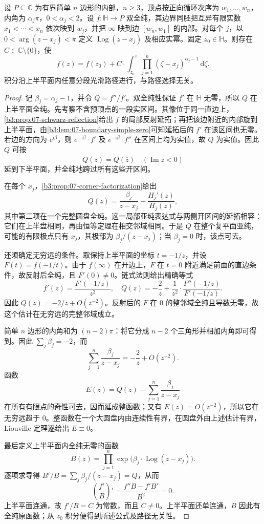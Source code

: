 \begin{theorem}\label{b3:thm:07-schwarz-christoffel}
设 \(P\subseteq\mathbb C\) 为有界简单 \(n\) 边形的内部，\(n\ge3\)，顶点按正向循环次序为 \(w_1,\ldots,w_n\)，内角为 \(\alpha_j\pi\)，\(0<\alpha_j<2\)。设 \(f:\mathbb H\rightarrow P\) 双全纯，其边界同胚把互异有限实数 \(x_1<\cdots<x_n\) 依次映到 \(w_j\)，并把 \(\infty\) 映到边 \([w_n,w_1]\) 的内部。对每个 \(j\)，以 \(0<\arg(z-x_j)<\pi\) 定义 \(\operatorname{Log}(z-x_j)\) 及相应实幂。固定 \(z_0\in\mathbb H\)。则存在 \(C\in\mathbb C\setminus\{0\}\)，使
\[
 f(z)=f(z_0)+C\cdot\int_{z_0}^{z}
 \prod_{j=1}^n(\zeta-x_j)^{\alpha_j-1}\,\mathrm{d}\zeta.
\]
积分沿上半平面内任意分段光滑路径进行，与路径选择无关。
\end{theorem}
\begin{proof}
记 \(\beta_j=\alpha_j-1\)，并令 \(Q=f''/f'\)。双全纯性保证 \(f'\) 在 \(\mathbb H\) 无零，所以 \(Q\) 在上半平面全纯。先考察不含预顶点的一段实区间。其像位于同一直边上，\cref{b3:prop:07-schwarz-reflection}给出 \(f\) 的局部反射延拓；再把该边附近的内部旋到上半平面，由\cref{b3:lem:07-boundary-simple-zero}可知延拓后的 \(f'\) 在该区间也无零。若边的方向为 \(e^{\mathrm{i}\beta}\)，则 \(e^{-\mathrm{i}\beta}\cdot f'\) 及 \(e^{-\mathrm{i}\beta}\cdot f''\) 在区间上均为实值，故 \(Q\) 为实值。因此 \(Q\) 可按
\[
 Q(z)=\overline{Q(\overline z)}\quad(\operatorname{Im}z<0)
\]
延到下半平面，并全纯地跨过所有这些开区间。

在每个 \(x_j\)，\cref{b3:prop:07-corner-factorization}给出
\[
 Q(z)=\frac{\beta_j}{z-x_j}+\frac{H_j'(z)}{H_j(z)},
\]
其中第二项在一个完整圆盘全纯。这一局部亚纯表达式与两侧开区间的延拓相容：它们在上半盘相同，再由恒等定理在相交邻域相同。于是 \(Q\) 在整个复平面亚纯，可能的有限极点只有 \(x_j\)，其极部为 \(\beta_j/(z-x_j)\)；当 \(\beta_j=0\) 时，该点可去。

还须确定无穷远的条件。取保持上半平面的坐标 \(t=-1/z\)，并设 \(F(t)=f(-1/t)\)。由于 \(f(\infty)\) 在开边上，\(F\) 在 \(t=0\) 附近满足前面的直边条件，故反射后全纯，且 \(F'(0)\ne0\)。链式法则给出精确等式
\[
 f'(z)=\frac{F'(-1/z)}{z^2},\quad
 Q(z)=-\frac2z+\frac1{z^2}\cdot
 \frac{F''(-1/z)}{F'(-1/z)}.
\]
因此 \(Q(z)=-2/z+O(z^{-2})\)。反射后的 \(F\) 在 \(0\) 的整邻域全纯且导数无零，故这个估计在无穷远的完整邻域成立。

简单 \(n\) 边形的内角和为 \((n-2)\pi\)：将它分成 \(n-2\) 个三角形并相加内角即可得到。因此 \(\sum_j\beta_j=-2\)，而
\[
 \sum_{j=1}^n\frac{\beta_j}{z-x_j}
 =-\frac2z+O(z^{-2}).
\]
函数
\[
 E(z)=Q(z)-\sum_{j=1}^n\frac{\beta_j}{z-x_j}
\]
在所有有限点的奇性可去，因而延成整函数；又有 \(E(z)=O(z^{-2})\)，所以它在无穷远趋于 \(0\)。整函数在一个大圆盘内由连续性有界，在圆盘外由上述估计有界，Liouville 定理遂给出 \(E\equiv0\)。

最后定义上半平面内全纯无零的函数
\[
 B(z)=\prod_{j=1}^n\exp\bigl(\beta_j\cdot\operatorname{Log}(z-x_j)\bigr).
\]
逐项求导得 \(B'/B=\sum_j\beta_j/(z-x_j)=Q\)，从而
\[
 \left(\frac{f'}B\right)'
 =\frac{f''B-f'B'}{B^2}=0.
\]
上半平面连通，故 \(f'/B=C\) 为常数，而且 \(C\ne0\)。上半平面还单连通，\(B\) 因此有全纯原函数；从 \(z_0\) 积分便得到所述公式及路径无关性。
\end{proof}

